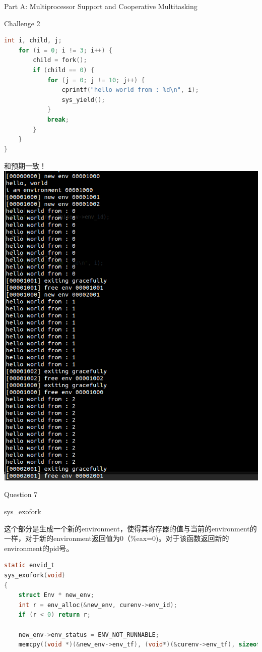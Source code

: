 \documentclass[GBK,winfonts,a4paper,10pt]{ctexart}
\begin{document}
\begin{section}{Part A: Multiprocessor Support and Cooperative Multitasking}
\begin{subsection}{Challenge 2}
\begin{lstlisting}[language=C]
	int i, child, j;
	for (i = 0; i != 3; i++) {
		child = fork();
		if (child == 0) {
			for (j = 0; j != 10; j++) {
				cprintf("hello world from : %d\n", i);
				sys_yield();
			}
			break;
		}
	}
}
\end{lstlisting}
\par
和预期一致！
\includegraphics[scale=0.5]{ch2.png}
\end{subsection}

\begin{subsection}{Question 7}
\begin{subsubsection}{sys\_exofork}
\par
这个部分是生成一个新的environment，使得其寄存器的值与当前的environment的一样，对于新的environment返回值为0（\%eax=0)。对于该函数返回新的environment的pid号。
\begin{lstlisting}[language=C]
static envid_t
sys_exofork(void)
{
	struct Env * new_env;
	int r = env_alloc(&new_env, curenv->env_id);
	if (r < 0) return r;
	
	new_env->env_status = ENV_NOT_RUNNABLE;
	memcpy((void *)(&new_env->env_tf), (void*)(&curenv->env_tf), sizeof(struct Trapframe));
	

\end{lstlisting}
\end{subsubsection}
\end{subsection}
\end{section}
\end{document}
